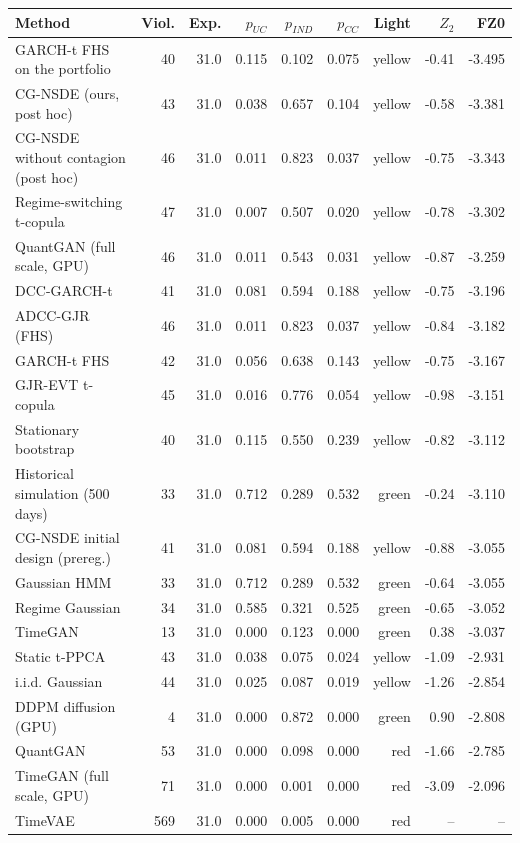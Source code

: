 \begin{tabular}{lrrrrrrrr}
\toprule
Method & Viol. & Exp. & $p_{UC}$ & $p_{IND}$ & $p_{CC}$ & Light & $Z_2$ & FZ0 \\
\midrule
GARCH-t FHS on the portfolio & 40 & 31.0 & 0.115 & 0.102 & 0.075 & yellow & -0.41 & -3.495 \\
CG-NSDE (ours, post hoc) & 43 & 31.0 & 0.038 & 0.657 & 0.104 & yellow & -0.58 & -3.381 \\
CG-NSDE without contagion (post hoc) & 46 & 31.0 & 0.011 & 0.823 & 0.037 & yellow & -0.75 & -3.343 \\
Regime-switching t-copula & 47 & 31.0 & 0.007 & 0.507 & 0.020 & yellow & -0.78 & -3.302 \\
QuantGAN (full scale, GPU) & 46 & 31.0 & 0.011 & 0.543 & 0.031 & yellow & -0.87 & -3.259 \\
DCC-GARCH-t & 41 & 31.0 & 0.081 & 0.594 & 0.188 & yellow & -0.75 & -3.196 \\
ADCC-GJR (FHS) & 46 & 31.0 & 0.011 & 0.823 & 0.037 & yellow & -0.84 & -3.182 \\
GARCH-t FHS & 42 & 31.0 & 0.056 & 0.638 & 0.143 & yellow & -0.75 & -3.167 \\
GJR-EVT t-copula & 45 & 31.0 & 0.016 & 0.776 & 0.054 & yellow & -0.98 & -3.151 \\
Stationary bootstrap & 40 & 31.0 & 0.115 & 0.550 & 0.239 & yellow & -0.82 & -3.112 \\
Historical simulation (500 days) & 33 & 31.0 & 0.712 & 0.289 & 0.532 & green & -0.24 & -3.110 \\
CG-NSDE initial design (prereg.) & 41 & 31.0 & 0.081 & 0.594 & 0.188 & yellow & -0.88 & -3.055 \\
Gaussian HMM & 33 & 31.0 & 0.712 & 0.289 & 0.532 & green & -0.64 & -3.055 \\
Regime Gaussian & 34 & 31.0 & 0.585 & 0.321 & 0.525 & green & -0.65 & -3.052 \\
TimeGAN & 13 & 31.0 & 0.000 & 0.123 & 0.000 & green & 0.38 & -3.037 \\
Static t-PPCA & 43 & 31.0 & 0.038 & 0.075 & 0.024 & yellow & -1.09 & -2.931 \\
i.i.d. Gaussian & 44 & 31.0 & 0.025 & 0.087 & 0.019 & yellow & -1.26 & -2.854 \\
DDPM diffusion (GPU) & 4 & 31.0 & 0.000 & 0.872 & 0.000 & green & 0.90 & -2.808 \\
QuantGAN & 53 & 31.0 & 0.000 & 0.098 & 0.000 & red & -1.66 & -2.785 \\
TimeGAN (full scale, GPU) & 71 & 31.0 & 0.000 & 0.001 & 0.000 & red & -3.09 & -2.096 \\
TimeVAE & 569 & 31.0 & 0.000 & 0.005 & 0.000 & red & -- & -- \\
\bottomrule
\end{tabular}
